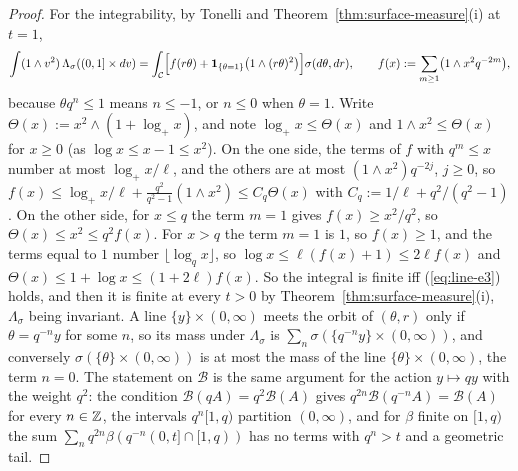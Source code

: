 \begin{proof}
For the integrability, by Tonelli and Theorem~\ref{thm:surface-measure}(i) at $t = 1$,
\[
  \int(1 \wedge v^2)\,\Lambda_\sigma((0,1] \times dv)
  = \int_{\mathcal{C}}\Bigl[f(r\theta) + \mathbf 1_{\{\theta = 1\}}\bigl(1 \wedge (r\theta)^2\bigr)\Bigr]
  \sigma(d\theta,dr), \qquad f(x) := \sum_{m \ge 1}\bigl(1 \wedge x^2q^{-2m}\bigr),
\]
because $\theta q^n \le 1$ means $n \le -1$, or $n \le 0$ when $\theta = 1$. Write
$\Theta(x) := x^2 \wedge (1 + \log_+x)$, and note $\log_+x \le \Theta(x)$ and $1 \wedge x^2 \le \Theta(x)$ for
$x \ge 0$ (as $\log x \le x - 1 \le x^2$). On the one side, the terms of $f$ with $q^m \le x$ number
at most $\log_+x/\ell$, and the others are at most $(1 \wedge x^2)q^{-2j}$, $j \ge 0$, so
$f(x) \le \log_+x/\ell + \tfrac{q^2}{q^2 - 1}(1 \wedge x^2) \le C_q\Theta(x)$ with
$C_q := 1/\ell + q^2/(q^2 - 1)$. On the other side, for $x \le q$ the term $m = 1$ gives
$f(x) \ge x^2/q^2$, so $\Theta(x) \le x^2 \le q^2f(x)$. For $x > q$ the term $m = 1$ is $1$, so
$f(x) \ge 1$, and the terms equal to $1$ number $\lfloor\log_qx\rfloor$, so
$\log x \le \ell(f(x) + 1) \le 2\ell f(x)$ and $\Theta(x) \le 1 + \log x \le (1 + 2\ell)f(x)$. So the
integral is finite iff (\ref{eq:line-e3}) holds, and then it is finite at every $t > 0$ by
Theorem~\ref{thm:surface-measure}(i), $\Lambda_\sigma$ being invariant. A line
$\{y\} \times (0,\infty)$ meets the orbit of $(\theta, r)$ only if $\theta = q^{-n}y$ for some $n$,
so its mass under $\Lambda_\sigma$ is $\sum_n\sigma(\{q^{-n}y\} \times (0,\infty))$, and conversely
$\sigma(\{\theta\} \times (0,\infty))$ is at most the mass of the line $\{\theta\} \times (0,\infty)$,
the term $n = 0$. The statement on $\mathcal{B}$ is the same argument for the action $y \mapsto qy$
with the weight $q^2$: the condition $\mathcal{B}(qA) = q^2\mathcal{B}(A)$ gives
$q^{2n}\mathcal{B}(q^{-n}A) = \mathcal{B}(A)$ for every $n \in \mathbb{Z}$, the intervals
$q^n[1,q)$ partition $(0,\infty)$, and for $\beta$ finite on $[1,q)$ the sum
$\sum_nq^{2n}\beta(q^{-n}(0,t] \cap [1,q))$ has no terms with $q^n > t$ and a geometric tail.


\end{proof}
